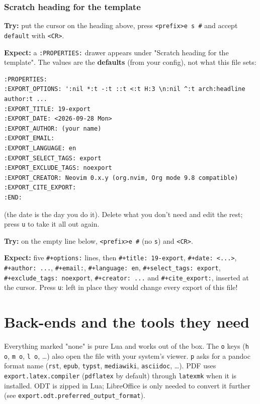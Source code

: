\subsubsection{Scratch heading for the template}
\label{sec:orgcb89e30}
\textbf{Try:} put the cursor on the heading above, press \texttt{<prefix>e s \#} and
accept \texttt{default} with \texttt{<CR>}.

\textbf{Expect:} a \texttt{:PROPERTIES:} drawer appears under "Scratch heading for the
template". The values are the \textbf{defaults} (from your config), not what
this file sets:

\begin{verbatim}
:PROPERTIES:
:EXPORT_OPTIONS: ':nil *:t -:t ::t <:t H:3 \n:nil ^:t arch:headline author:t ...
:EXPORT_TITLE: 19-export
:EXPORT_DATE: <2026-09-28 Mon>
:EXPORT_AUTHOR: (your name)
:EXPORT_EMAIL:
:EXPORT_LANGUAGE: en
:EXPORT_SELECT_TAGS: export
:EXPORT_EXCLUDE_TAGS: noexport
:EXPORT_CREATOR: Neovim 0.x.y (org.nvim, Org mode 9.8 compatible)
:EXPORT_CITE_EXPORT:
:END:
\end{verbatim}

(the date is the day you do it). Delete what you don't need and edit the
rest; press \texttt{u} to take it all out again.

\textbf{Try:} on the empty line below, \texttt{<prefix>e \#} (no \texttt{s}) and \texttt{<CR>}.

\textbf{Expect:} five \texttt{\#+options:} lines, then \texttt{\#+title: 19-export}, \texttt{\#+date:
<...>}, \texttt{\#+author: ...}, \texttt{\#+email:}, \texttt{\#+language: en}, \texttt{\#+select\_tags:
export}, \texttt{\#+exclude\_tags: noexport}, \texttt{\#+creator: ...} and \texttt{\#+cite\_export:},
inserted at the cursor. Press \texttt{u}: left in place they would change every
export of this file!
\section{Back-ends and the tools they need}
\label{sec:org4dafb16}
Everything marked "none" is pure Lua and works out of the box. The \texttt{o}
keys (\texttt{h o}, \texttt{m o}, \texttt{l o}, \ldots{}) also open the file with your system's
viewer. \texttt{p} asks for a pandoc format name (\texttt{rst}, \texttt{epub}, \texttt{typst},
\texttt{mediawiki}, \texttt{asciidoc}, \ldots{}). PDF uses \texttt{export.latex.compiler}
(\texttt{pdflatex} by default) through \texttt{latexmk} when it is installed. ODT is
zipped in Lua; LibreOffice is only needed to convert it further (see
\texttt{export.odt.preferred\_output\_format}).

